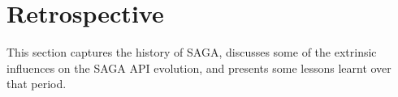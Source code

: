 \documentclass{article}
\begin{document}





\section{Retrospective}
\label{sec:retro}

 This section captures the history of SAGA, discusses some of the
 extrinsic influences on the SAGA API evolution, and presents some
 lessons learnt over that period.  

\end{document}
